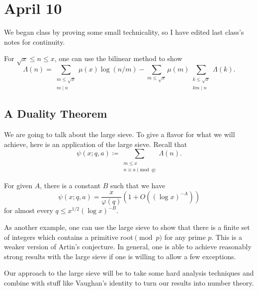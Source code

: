 \documentclass[../notes.tex]{subfiles}
\begin{document}
\section{April 10}

We began class by proving some small technicality, so I have edited last class's notes for continuity.
\begin{remark}
	For $\sqrt x\le n\le x$, one can use the bilinear method to show
	\[\Lambda(n)=\sum_{\substack{m\le\sqrt x\\m\mid n}}\mu(x)\log(n/m)-\sum_{m\le\sqrt x}\mu(m)\sum_{\substack{k\le\sqrt x\\km\mid n}}\Lambda(k).\]
\end{remark}

\subsection{A Duality Theorem}
We are going to talk about the large sieve. To give a flavor for what we will achieve, here is an application of the large sieve. Recall that
\[\psi(x;q,a)\coloneqq\sum_{\substack{m\le x\\n\equiv a\pmod q}}\Lambda(n).\]
\begin{theorem}
	For given $A$, there is a constant $B$ such that we have
	\[\psi(x;q,a)=\frac x{\varphi(q)}\left(1+O\left((\log x)^{-A}\right)\right)\]
	for almost every $q\le x^{1/2}(\log x)^{-B}$.
\end{theorem}
\begin{remark}
	As another example, one can use the large sieve to show that there is a finite set of integers which contains a primitive root$\pmod p$ for any prime $p$. This is a weaker version of Artin's conjecture. In general, one is able to achieve reasonably strong results with the large sieve if one is willing to allow a few exceptions.
\end{remark}
Our approach to the large sieve will be to take some hard analysis techniques and combine with stuff like Vaughan's identity to turn our results into number theory.
\end{document}

